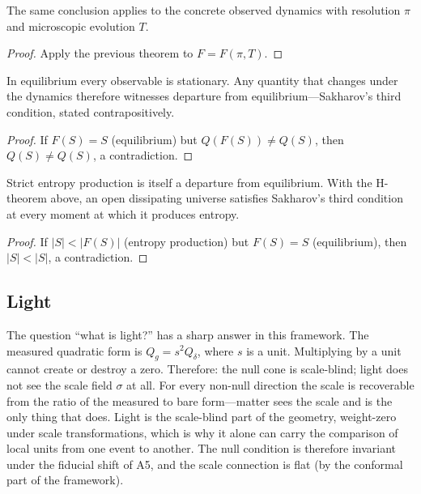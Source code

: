 \begin{theorem}
The same conclusion applies to the concrete observed dynamics with resolution $\pi$ and microscopic evolution $T$.
\end{theorem}

\begin{proof}
Apply the previous theorem to $F = F(\pi, T)$.
\end{proof}

\begin{theorem}
In equilibrium every observable is stationary. Any quantity that changes under the dynamics therefore witnesses departure from equilibrium—Sakharov's third condition, stated contrapositively.
\end{theorem}

\begin{proof}
If $F(S) = S$ (equilibrium) but $Q(F(S)) \neq Q(S)$, then $Q(S) \neq Q(S)$, a contradiction.
\end{proof}

\begin{theorem}
Strict entropy production is itself a departure from equilibrium. With the H-theorem above, an open dissipating universe satisfies Sakharov's third condition at every moment at which it produces entropy.
\end{theorem}

\begin{proof}
If $|S| < |F(S)|$ (entropy production) but $F(S) = S$ (equilibrium), then $|S| < |S|$, a contradiction.
\end{proof}

\subsection{Light}

The question ``what is light?'' has a sharp answer in this framework. The measured quadratic form is $Q_g = s^2 Q_\delta$, where $s$ is a unit. Multiplying by a unit cannot create or destroy a zero. Therefore: the null cone is scale-blind; light does not see the scale field $\sigma$ at all. For every non-null direction the scale is recoverable from the ratio of the measured to bare form—matter sees the scale and is the only thing that does. Light is the scale-blind part of the geometry, weight-zero under scale transformations, which is why it alone can carry the comparison of local units from one event to another. The null condition is therefore invariant under the fiducial shift of A5, and the scale connection is flat (by the conformal part of the framework).


